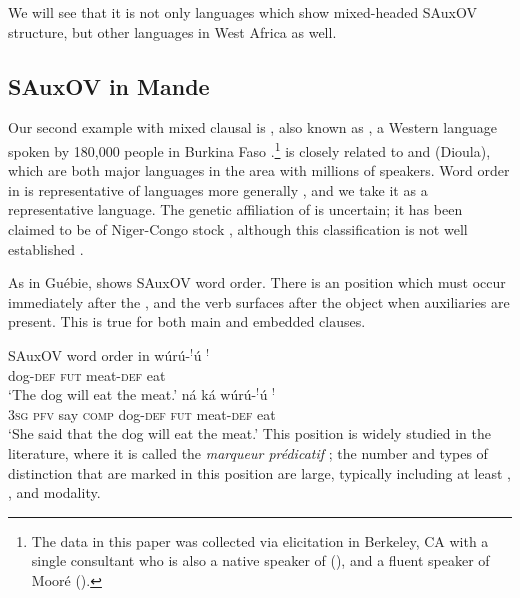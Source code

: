 \documentclass[output=paper]{LSP/langsci}
\begin{document}
We will see that it is not only  languages which show mixed-headed SAuxOV structure, but other languages in West Africa as well.

\subsection{SAuxOV in Mande}\label{sec:Mande}

Our second example with mixed clausal  is , also known as , a Western  language spoken by 180,000 people in Burkina Faso \citep{prost77,diallo88}.\footnote{The  data in this paper was collected via elicitation in Berkeley, CA with a single consultant who is also a native speaker of  (), and a fluent speaker of Moor\'e ().}  is closely related to  and  (Dioula), which are both major  languages in the area with millions of speakers. Word order in  is representative of  languages more generally \citep[e.g.][]{Creissels2005typology, nikitina11}, and we take it as a representative language. The genetic affiliation of  is uncertain; it has been claimed to be of Niger-Congo stock \citep{Greenberg:1966}, although this classification is not well established \citep{Dimmendaal:2008}.

As in Gu\'ebie,  shows SAuxOV word order. There is an  position which must occur immediately after the , and the verb surfaces after the object when auxiliaries are present. This is true for both main and embedded clauses.

\ea SAuxOV word order in  \label{ex:7:dafing}
\ea \gll w\'ur\'u-$^!$\'u \textbf{$^!$}  \textbf{}  \\
{dog}-\textsc{def} \textsc{fut} meat-\textsc{def} eat\\
\glt `The dog will eat the meat.' \label{ex:7a:dafing}
\ex \gll {} n\'a  k\'a w\'ur\'u-$^!$\'u \textbf{$^!$}  \textbf{}  \\
\textsc{3sg} \textsc{pfv} say \textsc{comp} {dog}-\textsc{def} \textsc{fut} meat-\textsc{def} eat\\
\glt `She said that the dog will eat the meat.' \label{ex:7b:dafing}
\z
\z
This  position is widely studied in the  literature, where it is called the \textit{marqueur pr\'edicatif} \citep[e.g.][]{idiatov2000}; the number and types of distinction that are marked in this position are large, typically including at least , , and modality. 
\end{document}
